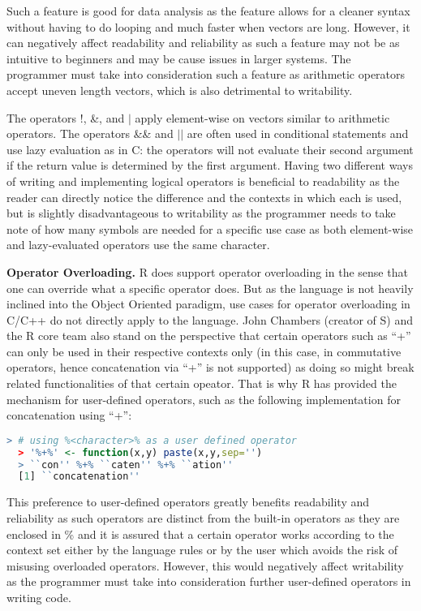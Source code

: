 \documentclass[12pt]{article}
\begin{document}
Such a feature is good for data analysis as the feature allows for a cleaner syntax without having to do looping and much faster when vectors are long. However, it can negatively affect readability and reliability as such a feature may not be as intuitive to beginners and may be cause issues in larger systems. The programmer must take into consideration such a feature as arithmetic operators accept uneven length vectors, which is also detrimental to writability.

The operators !, \&, and \(|\) apply element-wise on vectors similar to arithmetic operators. The operators \&\& and \(||\) are often used in conditional statements and use lazy evaluation as in C: the operators will not evaluate their second argument if the return value is determined by the first argument. Having two different ways of writing and implementing logical operators is beneficial to readability as the reader can directly notice the difference and the contexts in which each is used, but is slightly disadvantageous to writability as the programmer needs to take note of how many symbols are needed for a specific use case as both element-wise and lazy-evaluated operators use the same character.

\textbf{Operator Overloading.}
R does support operator overloading in the sense that one can override what a specific operator does. But as the language is not heavily inclined into the Object Oriented paradigm, use cases for operator overloading in C/C++ do not directly apply to the language. John Chambers (creator of S) and the R core team also stand on the perspective that certain operators such as ``+'' can only be used in their respective contexts only (in this case, in commutative operators, hence concatenation via ``+'' is not supported) as doing so might break related functionalities of that certain opeator. That is why R has provided the mechanism for user-defined operators, such as the following implementation for concatenation using ``+'':

\begin{lstlisting}[language=R ]
  > # using %<character>% as a user defined operator
  > '%+%' <- function(x,y) paste(x,y,sep='')
  > ``con'' %+% ``caten'' %+% ``ation''
  [1] ``concatenation''
\end{lstlisting}

  This preference to user-defined operators greatly benefits readability and reliability as such operators are distinct from the built-in operators as they are enclosed in \% and it is assured that a certain operator works according to the context set either by the language rules or by the user which avoids the risk of misusing overloaded operators. However, this would negatively affect writability as the programmer must take into consideration further user-defined operators in writing code.
\end{document}

